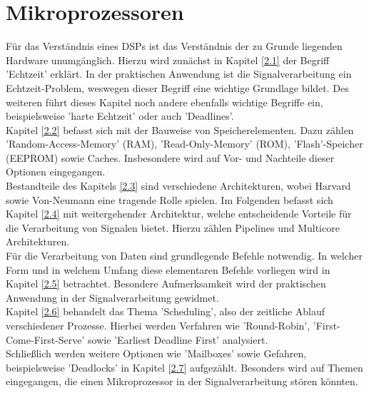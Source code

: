 \section{Mikroprozessoren}\label{2}

Für das Verständnis eines DSPs ist das Verständnis der zu Grunde liegenden Hardware unumgänglich. Hierzu wird zunächst in Kapitel \ref{2.1} der Begriff 'Echtzeit' erklärt. In der praktischen Anwendung ist die Signalverarbeitung ein Echtzeit-Problem, weswegen dieser Begriff eine wichtige Grundlage bildet. Des weiteren führt dieses Kapitel noch andere ebenfalls wichtige Begriffe ein, beispielsweise 'harte Echtzeit' oder auch 'Deadlines'.\\
Kapitel \ref{2.2} befasst sich mit der Bauweise von Speicherelementen. Dazu zählen 'Random-Access-Memory' (RAM), 'Read-Only-Memory' (ROM), 'Flash'-Speicher (EEPROM) sowie Caches. Insbesondere wird auf Vor- und Nachteile dieser Optionen eingegangen.\\
Bestandteile des Kapitels \ref{2.3} sind verschiedene Architekturen, wobei Harvard sowie Von-Neumann eine tragende Rolle spielen.
Im Folgenden befasst sich Kapitel \ref{2.4} mit weitergehender Architektur, welche entscheidende Vorteile für die Verarbeitung von Signalen bietet. Hierzu zählen Pipelines und Multicore Architekturen.\\
Für die Verarbeitung von Daten sind grundlegende Befehle notwendig. In welcher Form und in welchem Umfang diese elementaren Befehle vorliegen wird in Kapitel \ref{2.5} betrachtet. Besondere Aufmerksamkeit wird der praktischen Anwendung in der Signalverarbeitung gewidmet.\\
Kapitel \ref{2.6} behandelt das Thema 'Scheduling', also der zeitliche Ablauf verschiedener Prozesse. Hierbei werden Verfahren wie 'Round-Robin', 'First-Come-First-Serve' sowie 'Earliest Deadline First' analysiert.\\
Schließlich werden weitere Optionen wie 'Mailboxes' sowie Gefahren, beispielsweise 'Deadlocks' in Kapitel \ref{2.7} aufgezählt. Besonders wird auf Themen eingegangen, die einen Mikroprozessor in der Signalverarbeitung stören könnten.\\
\newpage

